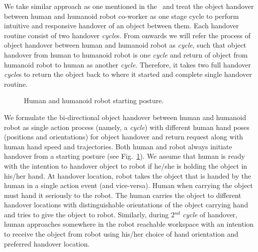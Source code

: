 We take similar approach as one mentioned in the~\cite{medina2016human, nemlekarprompt} and treat the object handover between human and humanoid robot co-worker as one stage cycle to perform intuitive and responsive handover of an object between them. Each handover routine consist of two handover \textit{cycle}s. From onwards we will refer the process of object handover between human and humanoid robot as \textit{cycle}, such that object handover from human to humanoid robot is one \textit{cycle} and return of object from humanoid robot to human as another \textit {cycle}. Therefore, it takes two full handover \textit{cycle}s to return the object back to where it started and complete single handover routine.

\begin{figure}[htbp]
		\caption{Human and humanoid robot starting posture.}
		\label{fig:halfsit}
\end{figure}

We formulate the bi-directional object handover between human and humanoid robot as single action process (namely, a \textit{cycle}) with different human hand poses (positions and orientations) for object handover and return request along with human hand speed and trajectories. Both human and robot always initiate handover from a starting posture (see Fig.~\ref{fig:halfsit}). We assume that human is ready with the intention to handover object to robot if he/she is holding the object in his/her hand. At handover location, robot takes the object that is handed by the human in a single action event (and vice-versa). Human when carrying the object must hand it seriously to the robot. The human carries the object to different handover locations with distinguishable orientations of the object carrying hand and tries to give the object to robot. Similarly, during 2$^{nd}$ \textit{cycle} of handover, human approaches somewhere in the robot reachable workspace with an intention to receive the object from robot using his/her choice of hand orientation and preferred handover location. 


